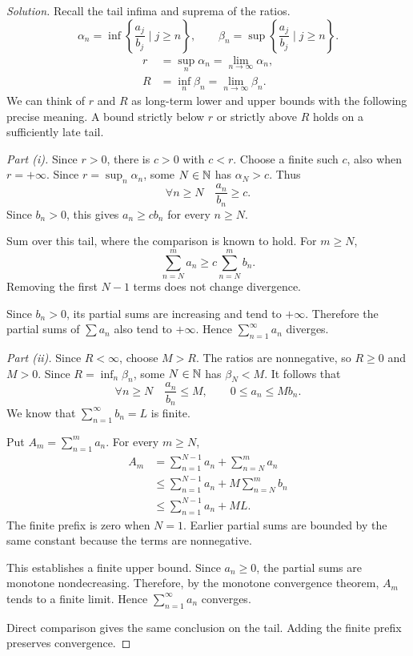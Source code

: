 \begin{proof}[Solution]
  Recall the tail infima and suprema of the ratios.
  \[
    \alpha_n=\inf\left\{\frac{a_j}{b_j}\mid j\ge n\right\},
    \qquad
    \beta_n=\sup\left\{\frac{a_j}{b_j}\mid j\ge n\right\}.
  \]
  \begin{align*}
    r&=\sup_n\alpha_n=\lim_{n\to\infty}\alpha_n,\\
    R&=\inf_n\beta_n=\lim_{n\to\infty}\beta_n.
  \end{align*}
  We can think of $r$ and $R$ as long-term lower and upper bounds
  with the following precise meaning. A bound strictly
  below $r$ or strictly above $R$ holds on a sufficiently late tail.

  \emph{Part (i).} Since $r>0$, there is $c>0$
  with $c<r$. Choose a finite such $c$, also when
  $r=+\infty$. Since $r=\sup_n\alpha_n$, some $N\in\mathbb{N}$ has
  $\alpha_N>c$. Thus
  \[
    \forall n\ge N\quad \frac{a_n}{b_n}\ge c.
  \]
  Since $b_n>0$, this gives $a_n\ge cb_n$ for every $n\ge N$.

  Sum over this tail, where the comparison is known to hold. For $m\ge N$,
  \[
    \sum_{n=N}^{m}a_n\ge c\sum_{n=N}^{m}b_n.
  \]
  Removing the first $N-1$ terms does not change divergence.

  Since $b_n>0$, its partial sums are increasing and tend to $+\infty$.
  Therefore the partial sums of $\sum a_n$ also tend to $+\infty$.
  Hence $\sum_{n=1}^{\infty}a_n$ diverges.

  \emph{Part (ii).} Since $R<\infty$, choose $M>R$.
  The ratios are nonnegative, so $R\ge0$ and $M>0$.
  Since $R=\inf_n\beta_n$, some $N\in\mathbb{N}$ has $\beta_N<M$.
  It follows that
  \[
    \forall n\ge N\quad \frac{a_n}{b_n}\le M,
    \qquad 0\le a_n\le Mb_n.
  \]
  We know that $\sum_{n=1}^{\infty}b_n=L$ is finite.

  Put $A_m=\sum_{n=1}^{m}a_n$. For every $m\ge N$,
  \begin{align*}
    A_m
      &=\sum_{n=1}^{N-1}a_n+\sum_{n=N}^{m}a_n\\
      &\le\sum_{n=1}^{N-1}a_n+M\sum_{n=N}^{m}b_n\\
      &\le\sum_{n=1}^{N-1}a_n+ML.
  \end{align*}
  The finite prefix is zero when $N=1$. Earlier partial sums are
  bounded by the same constant because the terms are nonnegative.

  This establishes a finite upper bound. Since
  $a_n\ge0$, the partial sums are monotone nondecreasing.
  Therefore, by the monotone convergence theorem,
  $A_m$ tends to a finite limit.
  Hence $\sum_{n=1}^{\infty}a_n$ converges.

  Direct comparison gives the same conclusion
  on the tail. Adding the finite prefix preserves
  convergence.
\end{proof}
